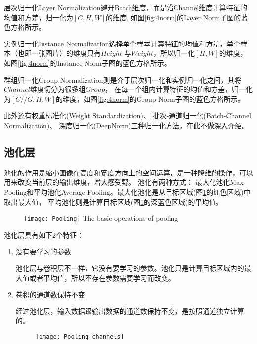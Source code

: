 \noindent{}层次归一化Layer Normalization避开Batch维度，而是沿Channel维度计算特征的均值和方差，归一化为$[C, H, W]$的维度,
如图\ref{fig:4norm}的Layer Norm子图的蓝色方格所示。

\noindent{}实例归一化Instance Normalization选择单个样本计算特征的均值和方差，单个样本（也即一张图片）的维度只有$Height$
与$Weight$，所以归一化$[H, W]$的维度，如图\ref{fig:4norm}的Instance Norm子图的蓝色方格所示。

\noindent{}群组归一化Group Normalization则是介于层次归一化和实例归一化之间，其将$Channel$维度切分为很多组$Group$，
在每一个组内计算特征的均值和方差，归一化为$[C//G, H, W]$的维度，如图\ref{fig:4norm}的Group Norm子图的蓝色方格所示。

此外还有权重标准化(Weight Standardization\cite{Qiao2019WeightS})、 
批次-通道归一化(Batch-Channel Normalization\cite{Qiao2019RethinkingNA})、
深度归一化(DeepNorm\cite{Zare2017DeepNormADL})三种归一化方法，在此不做深入介绍。

\subsection{池化层}
池化的作用是缩小图像在高度和宽度方向上的空间运算，是一种降维的操作，可以用来改变当前层的输出维度，增大感受野。 池化有两种方式：
最大化池化Max Pooling和平均池化Average Pooling。最大化池化是从目标区域(图\ref{fig:pooling}的红色区域)中取出最大值，
平均池化则是计算目标区域(图\ref{fig:pooling}的深蓝色区域)的平均值。
\begin{figure}[!htp]
    \centering
    \texttt{[image: Pooling]}
        {The basic operations of pooling}
    \label{fig:pooling}
\end{figure}

池化层具有如下2个特征：
\begin{enumerate}
    \item {\heiti 没有要学习的参数}
    
    池化层与卷积层不一样，它没有要学习的参数。池化只是计算目标区域内的最大值或者平均值，所以不存在参数需要学习而改变。
    \item {\heiti 卷积的通道数保持不变}
    
    经过池化层，输入数据跟输出数据的通道数保持不变，是按照通道独立计算的。
    \begin{figure}[h]
        \centering
        \texttt{[image: Pooling\_channels]}
    \end{figure}
\end{enumerate}


